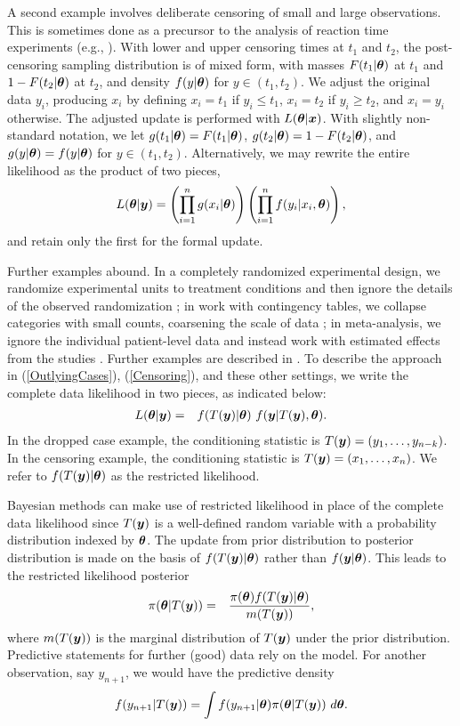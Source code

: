 \documentclass[12pt]{article}
\def\bth{\mbox{\boldmath $\theta$}}
\newcommand{\bx}{\mbox{\boldmath $x$}}
\newcommand{\by}{\mbox{\boldmath $y$}}
\begin{document}
A second example involves deliberate censoring of small and large observations.  This is
sometimes done as a precursor to the analysis of reaction time experiments (e.g., \cite{ratcliff1993}).  
With lower
and upper censoring times at $t_1$ and $t_2$, the post-censoring sampling distribution
is of mixed form, with masses $F(t_1|\bth)$ at $t_1$ and $1-F(t_2|\bth)$ at $t_2$,
and density $f(y | \bth)$ for $y \in (t_1, t_2)$.  We adjust the original data $y_i$,
producing $x_i$ by defining $x_i = t_1$ if $y_i \leq t_1$, 
$x_i = t_2$ if $y_i \geq t_2$, and $x_{i}=y_{i}$ otherwise.  
The adjusted update is performed with $L(\bth | \bx)$. 
With slightly non-standard notation, we let $g(t_1|\bth) = F(t_1|\bth)$,
$g(t_2 | \bth) = 1 - F(t_2|\bth)$, and $g(y|\bth)=f(y|\bth)$ for
$y \in (t_1, t_2)$.
Alternatively, we may rewrite the entire likelihood as the product of
two pieces, 
\begin{eqnarray}
\label{Censoring}
L(\bth | \by) =  
\left( \prod_{i=1}^n g(x_i | \bth) \right) \left( \prod_{i=1}^n f(y_i|x_i,\bth) \right) ,  
\end{eqnarray}
and retain only the first for the formal update.  

Further examples abound.  In a completely randomized experimental design, we randomize %
experimental units to treatment conditions and then ignore the details of the observed randomization \citep{dean1999}; 
in work with contingency tables,  
we collapse categories with small counts, coarsening the scale of %
data \citep{agresti2002}; in meta-analysis, we ignore the individual patient-level data and instead
work with estimated effects from the studies \citep{orourke2007}.  
Further examples are described in \cite{lewis2014}.  
To describe the approach in (\ref{OutlyingCases}), 
(\ref{Censoring}), and these other settings,
we write the complete data likelihood in two pieces, as indicated below:
\begin{eqnarray}
\label{FullLikelihood}
L(\bth | \by)  
& = & f(T(\by) | \bth) \,\, f(\by | T(\by), \bth) .  
\end{eqnarray}
In the dropped case example, the conditioning statistic is $T(\by) = (y_1, \ldots, y_{n-k})$.  In 
the censoring example, the conditioning statistic is $T(\by) = (x_1, \ldots, x_n)$.  We refer to 
$f(T(\by) | \bth)$ as the restricted likelihood.  

Bayesian methods can make use of restricted likelihood in place of the complete data likelihood
since $T(\by)$ is a well-defined random variable with a probability distribution indexed by $\bth$.  
The update from prior distribution to posterior distribution is 
made on the basis of $f(T(\by)|\bth)$ rather than $f(\by|\bth)$.  This leads to the restricted likelihood posterior 
\begin{eqnarray}
\label{RestrictedPosterior}
\pi(\bth | T(\by)) & = & \frac{\pi(\bth) f(T(\by) | \bth)}{m(T(\by))} ,
\end{eqnarray}
where $m(T(\by))$ is the marginal distribution of $T(\by)$ under the prior distribution.  
Predictive statements for further (good) data rely on the model.  For another observation,
say $y_{n+1}$, we would have the predictive density 
\[
f(y_{n+1} | T(\by)) = \int f(y_{n+1} | \bth) \pi(\bth | T(\by))\ d\bth .  
\]
\end{document}
